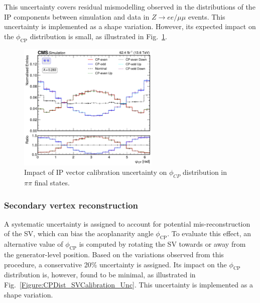 This uncertainty covers residual mismodelling observed in the distributions of the \ac{IP} components between simulation and data in $Z \to ee/\mu\mu$ events.  This uncertainty is implemented as a shape variation. However, its expected impact on the $\phi_{\text{CP}}$ distribution is small, as illustrated in Fig.~\ref{Figure:CPDist_IPCalibration_Unc}.

\begin{figure}[!htbp]
    \centering
    \includegraphics[width=0.6\textwidth]{Figures/Chapter7/Acoplanarity/Angular_Systematics/aco_pi_pi.pdf}
    \caption{Impact of IP vector calibration uncertainty on $\phi_{CP}$ distribution in $\pi\pi$ final states.}
    \label{Figure:CPDist_IPCalibration_Unc}
\end{figure}

\subsubsection{Secondary vertex reconstruction}
A systematic uncertainty is assigned to account for potential mis-reconstruction of the \ac{SV}, which can bias the acoplanarity angle $\phi_{\text{CP}}$.  
To evaluate this effect, an alternative value of $\phi_{\text{CP}}$ is computed by rotating the \ac{SV} towards or away from the generator-level position.  
Based on the variations observed from this procedure, a conservative 20\% uncertainty is assigned.  Its impact on the $\phi_{\text{CP}}$ distribution is, however, found to be minimal, as illustrated in Fig.~\ref{Figure:CPDist_SVCalibration_Unc}.  
This uncertainty is implemented as a shape variation.


